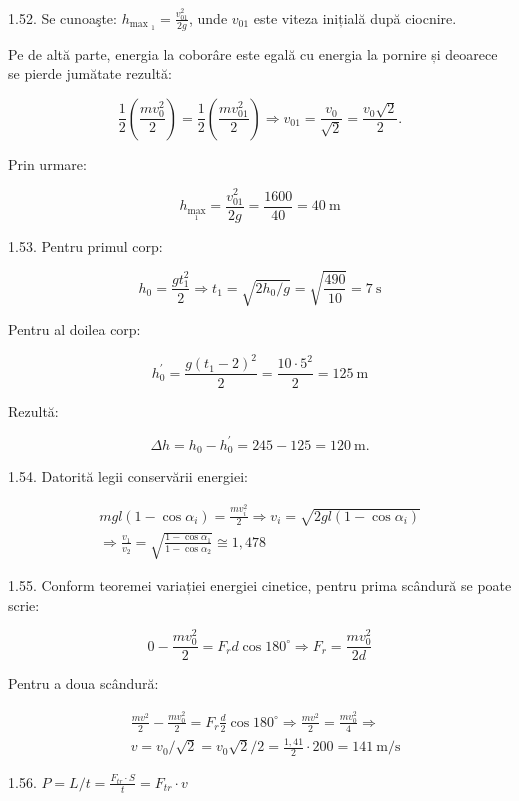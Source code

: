 \documentclass[10pt]{article}
\begin{document}
1.52. Se cunoaşte: $h_{\text {max }_{1}}=\frac{v_{01}^{2}}{2 g}$, unde $v_{01}$ este viteza inițială după ciocnire.

Pe de altă parte, energia la coborâre este egală cu energia la pornire și deoarece se pierde jumătate rezultă:

$$
\frac{1}{2}\left(\frac{m v_{0}^{2}}{2}\right)=\frac{1}{2}\left(\frac{m v_{01}^{2}}{2}\right) \Rightarrow v_{01}=\frac{v_{0}}{\sqrt{2}}=\frac{v_{0} \sqrt{2}}{2} .
$$

Prin urmare:

$$
h_{\max _{1}}=\frac{v_{01}^{2}}{2 g}=\frac{1600}{40}=40 \mathrm{~m}
$$

1.53. Pentru primul corp:

$$
h_{0}=\frac{g t_{1}^{2}}{2} \Rightarrow t_{1}=\sqrt{2 h_{0} / g}=\sqrt{\frac{490}{10}}=7 \mathrm{~s}
$$

Pentru al doilea corp:

$$
h_{0}^{\prime}=\frac{g\left(t_{1}-2\right)^{2}}{2}=\frac{10 \cdot 5^{2}}{2}=125 \mathrm{~m}
$$

Rezultă:

$$
\Delta h=h_{0}-h_{0}^{\prime}=245-125=120 \mathrm{~m} .
$$

1.54. Datorită legii conservării energiei:

$$
\begin{gathered}
m g l\left(1-\cos \alpha_{i}\right)=\frac{m v_{i}^{2}}{2} \Rightarrow v_{i}=\sqrt{2 g l\left(1-\cos \alpha_{i}\right)} \\
\Rightarrow \frac{v_{1}}{v_{2}}=\sqrt{\frac{1-\cos \alpha_{1}}{1-\cos \alpha_{2}}} \cong 1,478
\end{gathered}
$$

1.55. Conform teoremei variației energiei cinetice, pentru prima scândură se poate scrie:

$$
0-\frac{m v_{0}^{2}}{2}=F_{r} d \cos 180^{\circ} \Rightarrow F_{r}=\frac{m v_{0}^{2}}{2 d}
$$

Pentru a doua scândură:

$$
\begin{aligned}
& \frac{m v^{2}}{2}-\frac{m v_{0}^{2}}{2}=F_{r} \frac{d}{2} \cos 180^{\circ} \Rightarrow \frac{m v^{2}}{2}=\frac{m v_{0}^{2}}{4} \Rightarrow \\
& v=v_{0} / \sqrt{2}=v_{0} \sqrt{2} / 2=\frac{1,41}{2} \cdot 200=141 \mathrm{~m} / \mathrm{s}
\end{aligned}
$$

1.56. $P=L / t=\frac{F_{t r} \cdot S}{t}=F_{t r} \cdot v$
\end{document}

